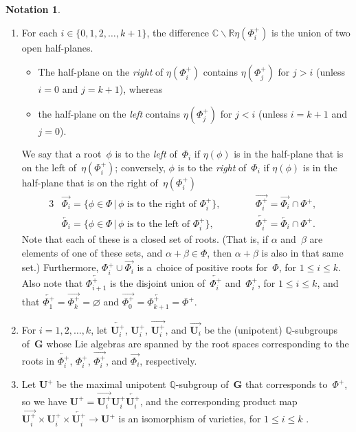 \documentclass[pdftex]{sigma}
\newcommand{\CC}{\mathbb{C}}
\newcommand{\QQ}{\mathbb{Q}}
\newcommand{\RR}{\mathbb{R}}
\newcommand{\Ga}{\mathbf{G}}
\newcommand{\Ua}{\mathbf{U}}
\newcommand{\ra}{\overrightarrow}
\newcommand{\la}{\overleftarrow}
\numberwithin{equation}{section}
\theoremstyle{definition}
\newtheorem{notation}[thm]{Notation}
\begin{document}
\begin{notation}
\begin{enumerate}
\item For each $i \in \{0,1,2,\ldots,k+1\}$, the difference $\CC \smallsetminus \RR \eta(\Phi^+_i)$ is the union of two open half-planes.
\begin{itemize}\itemsep=0pt
\item The half-plane on the \emph{right} of $\eta(\Phi^+_i)$ contains $\eta(\Phi^+_j)$ for $j > i$ (unless $i = 0$ and $j = k+1$), whereas
\item the half-plane on the \emph{left} contains $\eta(\Phi^+_j)$ for $j < i$ (unless $i = k + 1$ and $j = 0$).
\end{itemize}
We say that a root~$\phi$ is to the \emph{left} of~$\Phi_i$ if $\eta(\phi)$ is in the half-plane that is on the left of~$\eta(\Phi^+_i)$; conversely, $\phi$ is to the \emph{right} of~$\Phi_i$ if $\eta(\phi)$ is in the half-plane that is on the right of~$\eta(\Phi^+_i)$
		\begin{alignat*}{3}
		& \ra{\Phi_i}= \{ \phi \in \Phi \,|\, \text{$\phi$ is to the right of $\Phi^+_i$} \},
		\qquad &&
		\ra{\Phi^+_i}= \ra{\Phi_i} \cap \Phi^+,& \\
		&\la{\Phi_i}= \{ \phi \in \Phi \,|\, \text{$\phi$ is to the left of $\Phi^+_i$} \},
		\qquad &&
		\la{\Phi^+_i}= \la{\Phi_i} \cap \Phi^+		.&
\end{alignat*}
Note that each of these is a closed set of roots. (That is, if $\alpha$ and~$\beta$ are elements of one of these sets, and $\alpha + \beta \in \Phi$, then $\alpha + \beta$ is also in that same set.)
Furthermore, $\Phi_i^+ \cup \ra{\Phi_i}$ is a~choice of positive roots for~$\Phi$, for $1 \le i \le k$.
Also note that $\la{\Phi^+_{i+1}}$ is the disjoint union of~$\la{\Phi^+_i}$ and~$\Phi^+_i$, for $1 \le i \le k$, and that
	 $\la{\Phi^+_1} = \ra{\Phi^+_k} = \varnothing$ and $\ra{\Phi^+_0} = \la{\Phi^+_{k+1}} = \Phi^+$.
\item For $i = 1,2,\ldots,k$, let $\la{\Ua_i^+}$, $\Ua_i^+$, $\ra{\Ua_i^+}$, and $\ra{\Ua_i}$ be the (unipotent) $\QQ$-subgroups of~$\Ga$ whose Lie algebras are spanned by the root spaces corresponding to the roots in $\la{\Phi_i^+}$, $\Phi_i^+$, $\ra{\Phi_i^+}$, and $\ra{\Phi_i}$, respectively.
\item Let $\Ua^+$ be the maximal unipotent $\QQ$-subgroup of~$\Ga$ that corresponds to~$\Phi^+$, so we have $\Ua^+ = \ra{\Ua_i^+} \Ua^+_i \la{\Ua_i^+}$, and the corresponding product map $\ra{\Ua_i^+} \times \Ua^+_i \times \la{\Ua_i^+} \to \Ua^+$ is an isomorphism of varieties, for $1 \le i \le k$ \cite[Proposition~3.11, pp.~77--78]{BorelTits-GrpRed}.
	

\end{enumerate}
\end{notation}
\end{document}
